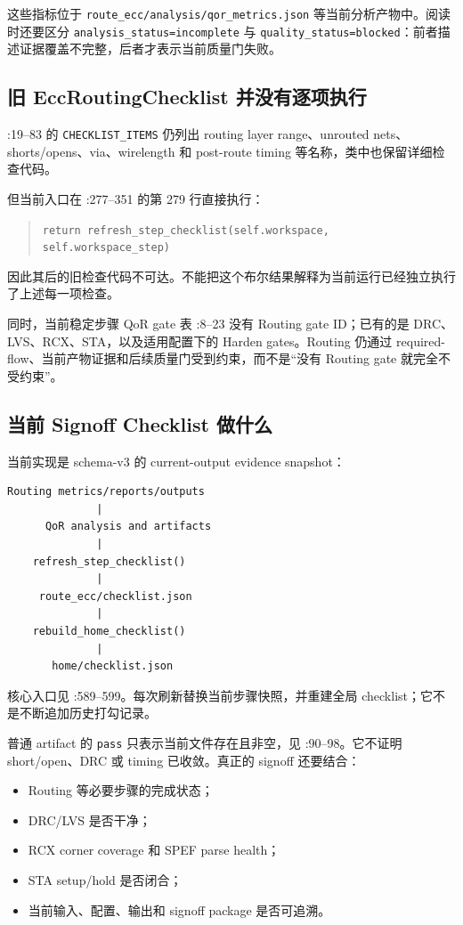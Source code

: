 \documentclass[UTF8,a4paper,11pt,fontset=fandol]{ctexart}
\newcommand{\code}[1]{\nolinkurl{#1}}
\begin{document}
这些指标位于 \code{route_ecc/analysis/qor_metrics.json} 等当前分析产物中。阅读时还要区分 \code{analysis_status=incomplete} 与 \code{quality_status=blocked}：前者描述证据覆盖不完整，后者才表示当前质量门失败。

\subsection{旧 EccRoutingChecklist 并没有逐项执行}

:19--83 的 \code{CHECKLIST_ITEMS} 仍列出 routing layer range、unrouted nets、shorts/opens、via、wirelength 和 post-route timing 等名称，类中也保留详细检查代码。

但当前入口在 :277--351 的第 279 行直接执行：
\begin{quote}
\code{return refresh_step_checklist(self.workspace, self.workspace_step)}
\end{quote}
因此其后的旧检查代码不可达。不能把这个布尔结果解释为当前运行已经独立执行了上述每一项检查。

同时，当前稳定步骤 QoR gate 表 :8--23 没有 Routing gate ID；已有的是 DRC、LVS、RCX、STA，以及适用配置下的 Harden gates。Routing 仍通过 required-flow、当前产物证据和后续质量门受到约束，而不是“没有 Routing gate 就完全不受约束”。

\subsection{当前 Signoff Checklist 做什么}

当前实现是 schema-v3 的 current-output evidence snapshot：
\begin{verbatim}
Routing metrics/reports/outputs
              |
      QoR analysis and artifacts
              |
    refresh_step_checklist()
              |
     route_ecc/checklist.json
              |
    rebuild_home_checklist()
              |
       home/checklist.json
\end{verbatim}

核心入口见 :589--599。每次刷新替换当前步骤快照，并重建全局 checklist；它不是不断追加历史打勾记录。

普通 artifact 的 \code{pass} 只表示当前文件存在且非空，见 :90--98。它不证明 short/open、DRC 或 timing 已收敛。真正的 signoff 还要结合：
\begin{itemize}
  \item Routing 等必要步骤的完成状态；
  \item DRC/LVS 是否干净；
  \item RCX corner coverage 和 SPEF parse health；
  \item STA setup/hold 是否闭合；
  \item 当前输入、配置、输出和 signoff package 是否可追溯。
\end{itemize}
\end{document}
